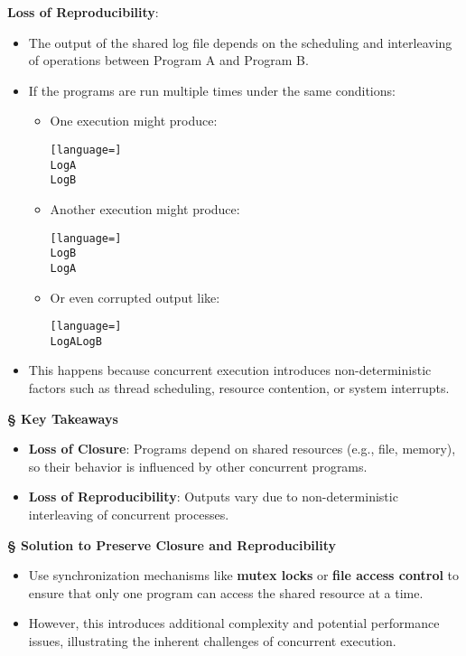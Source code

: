\documentclass[a4paper]{book}
\newcommand{\sfbf}[1]{{\normalsize\textsf{\textbf{§ #1}}}}
\begin{document}
\textbf{Loss of Reproducibility}:
\begin{itemize}
\item 
The output of the shared log file depends on the scheduling and interleaving of operations between Program A and Program B.

\item 
If the programs are run multiple times under the same conditions:
\begin{itemize}
\item 
One execution might produce:

\begin{lstlisting}[language=]
LogA
LogB
\end{lstlisting}

\item 
Another execution might produce:

\begin{lstlisting}[language=]
LogB
LogA
\end{lstlisting}

\item 
Or even corrupted output like:

\begin{lstlisting}[language=]
LogALogB
\end{lstlisting}

\end{itemize}

\item 
This happens because concurrent execution introduces non-deterministic factors such as thread scheduling, resource contention, or system interrupts.

\end{itemize}

\hrulefill

\sfbf{Key Takeaways}

\begin{itemize}
\item 
\textbf{Loss of Closure}: Programs depend on shared resources (e.g., file, memory), so their behavior is influenced by other concurrent programs.

\item 
\textbf{Loss of Reproducibility}: Outputs vary due to non-deterministic interleaving of concurrent processes.

\end{itemize}

\sfbf{Solution to Preserve Closure and Reproducibility}

\begin{itemize}
\item 
Use synchronization mechanisms like \textbf{mutex locks} or \textbf{file access control} to ensure that only one program can access the shared resource at a time.

\item 
However, this introduces additional complexity and potential performance issues, illustrating the inherent challenges of concurrent execution.

\end{itemize}
\end{document}
